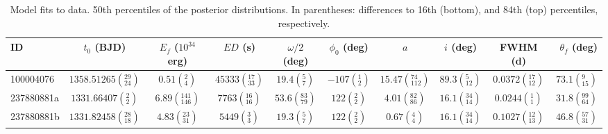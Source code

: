 \begin{table*}
\centering
\caption{Model fits to data. 50th percentiles of the posterior distributions. In parentheses: differences to 16th (bottom), and 84th (top) percentiles, respectively.}
\label{tab:results}

\begin{tabular}{lccccccccr}
\hline
         ID &                          $t_0$ (BJD) & $E_f$ ($10^{34}$ erg) &                        $ED$ (s) &                   $\omega/2$ (deg) &               $\phi_0$ (deg) &                              $a$ &                      $i$ (deg) &                         FWHM (d) &               $\theta_f$ (deg) \\
\hline
  100004076 &  $1358.51265\left(^{29}_{24}\right)$ &      $0.51\left(^{2}_{4}\right)$ &  $45333\left(^{17}_{33}\right)$ &    $19.4\left(^{5}_{7}\right)$ &  $-107\left(^{1}_{2}\right)$ &  $15.47\left(^{74}_{112}\right)$ &   $89.3\left(^{5}_{12}\right)$ &  $0.0372\left(^{17}_{12}\right)$ &   $73.1\left(^{9}_{15}\right)$ \\
 237880881a &    $1331.66407\left(^{2}_{2}\right)$ &  $6.89\left(^{141}_{146}\right)$ &   $7763\left(^{16}_{16}\right)$ &  $53.6\left(^{83}_{79}\right)$ &   $122\left(^{2}_{2}\right)$ &    $4.01\left(^{82}_{86}\right)$ &  $16.1\left(^{34}_{14}\right)$ &    $0.0244\left(^{1}_{1}\right)$ &  $31.8\left(^{99}_{64}\right)$ \\
 237880881b &  $1331.82458\left(^{28}_{18}\right)$ &    $4.83\left(^{23}_{31}\right)$ &     $5449\left(^{3}_{3}\right)$ &    $19.3\left(^{5}_{7}\right)$ &   $122\left(^{2}_{2}\right)$ &      $0.67\left(^{4}_{4}\right)$ &  $16.1\left(^{34}_{14}\right)$ &  $0.1027\left(^{12}_{13}\right)$ &  $46.8\left(^{57}_{31}\right)$ \\
\hline

\end{tabular}




\end{table*}
